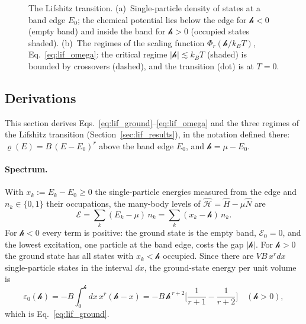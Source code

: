 \documentclass[10pt,a4paper]{article}
\theoremstyle{plain}
\theoremstyle{remark}
\newcommand{\hfield}{\mathscr{h}}  %
\newcommand{\enrg}{\mathcal{E}}  %
\begin{document}
\begin{figure}[htbp]
\caption{The Lifshitz transition.
(a)~Single-particle density of states at a band edge $E_0$; the chemical
potential lies below the edge for $\hfield<0$ (empty band) and inside the
band for $\hfield>0$ (occupied states shaded).
(b)~The regimes of the scaling function $\Phi_r(\hfield/k_BT)$,
Eq.~\eqref{eq:lif_omega}: the critical regime $|\hfield|\lesssim k_BT$
(shaded) is bounded by crossovers (dashed), and the transition (dot) is at
$T=0$.}
\label{fig:lifshitz}
\end{figure}

\subsection{Derivations}
\label{sec:lif_deriv}

This section derives Eqs.~\eqref{eq:lif_ground}--\eqref{eq:lif_omega} and
the three regimes of the Lifshitz transition
(Section~\ref{sec:lif_results}), in the notation defined there:
$\varrho(E)=B\,(E-E_0)^{r}$ above the band edge $E_0$, and
$\hfield=\mu-E_0$.

\paragraph{Spectrum.} With $x_k:=E_k-E_0\ge0$ the single-particle energies
measured from the edge and $n_k\in\{0,1\}$ their occupations, the many-body
levels of $\hat{\mathcal H}=\hat H-\mu\hat N$ are
\begin{equation}\label{eq:lif_levels}
  \enrg=\sum_k(E_k-\mu)\,n_k=\sum_k(x_k-\hfield)\,n_k .
\end{equation}
For $\hfield<0$ every term is positive: the ground state is the empty band,
$\enrg_0=0$, and the lowest excitation, one particle at the band edge, costs
the gap $|\hfield|$. For $\hfield>0$ the ground state has all states with
$x_k<\hfield$ occupied. Since there are $VB\,x^{r}dx$ single-particle states
in the interval $dx$, the ground-state energy per unit volume is
\[
  \varepsilon_0(\hfield)=-B\int_0^{\hfield}dx\,x^{r}(\hfield-x)
  =-B\,\hfield^{\,r+2}\Big[\frac{1}{r+1}-\frac{1}{r+2}\Big]
  \quad(\hfield>0) ,
\]
which is Eq.~\eqref{eq:lif_ground}.
\end{document}
